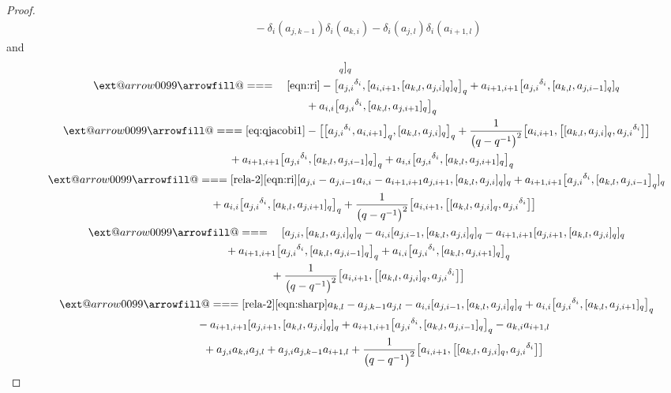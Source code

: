 \documentclass[10pt,a4paper]{amsart}
\makeatletter
\def\x@arrow{\DOTSB\Relbar}
\def\xlongequalsignfill@{\arrowfill@\x@arrow\Relbar\x@arrow}
\providecommand{\xlongequal}[2][]{%
	\ext@arrow 0099\xlongequalsignfill@{#1}{#2}}
\numberwithin{equation}{section}
\def\d{\delta}
\makeatother
\begin{document}
\begin{proof}
\begin{gather*}
\qquad\qquad {}-\d_i (a_{j,k-1} )\d_i (a_{k,i} ) -\d_i (a_{j, l} ) \d_i (a_{i+1, l} )
\end{gather*}
and
\begin{gather*}
 [\d_i(a_{j,i}), [\d_i (a_{k,l} ),\d_i(a_{j,i}) ]_q ]_q \\
 \qquad\xlongequal[\quad]{\eqref{eqn:ri}} - \bigl[{a_{j,i}}^{\d_i}, [a_{i,i+1}, [a_{k,l},a_{j,i} ]_q ]_q \bigr]_q + a_{i+1,i+1} \bigl[{a_{j,i}}^{\d_i}, [a_{k,l},a_{j,i-1} ]_q ]_q \\
\qquad\qquad\ \ {}+ a_{i,i} \bigl[{a_{j,i}}^{\d_i}, [a_{k,l},a_{j,i+1} ]_q \bigr]_q \\
 \qquad\xlongequal{\eqref{eq:qjacobi1}} - \bigl[ \bigl[{a_{j,i}}^{\d_i},a_{i,i+1} \bigr]_q, [a_{k,l},a_{j,i} ]_q \bigr]_q +\frac{1}{\bigl(q-q^{-1}\bigr)^2} \bigl[a_{i,i+1}, \bigl[ [a_{k,l},a_{j,i} ]_q, {a_{j,i}}^{\d_i} \bigr] \bigr]\\
\qquad\qquad \ \ {}+ a_{i+1,i+1} \bigl[{a_{j,i}}^{\d_i}, [a_{k,l},a_{j,i-1} ]_q \bigr]_q + a_{i,i} \bigl[{a_{j,i}}^{\d_i}, [a_{k,l},a_{j,i+1} ]_q \bigr]_q \\
\qquad \xlongequal[\eqref{rela-2}]{\eqref{eqn:ri}} [a_{j,i}-a_{j,i-1}a_{i,i}-a_{i+1,i+1}a_{j,i+1}, [a_{k,l},a_{j,i} ]_q ]_q + a_{i+1,i+1} \bigl[{a_{j,i}}^{\d_i}, [a_{k,l},a_{j,i-1} \bigr]_q ]_q \\
\qquad\qquad \quad {}+ a_{i,i} \bigl[{a_{j,i}}^{\d_i}, [a_{k,l},a_{j,i+1} ]_q \bigr]_q +\frac{1}{\bigl(q-q^{-1}\bigr)^2} \bigl[a_{i,i+1}, \bigl[ [a_{k,l},a_{j,i} ]_q, {a_{j,i}}^{\d_i} \bigr] \bigr]\\
\qquad \xlongequal{\quad} [a_{j,i}, [a_{k,l},a_{j,i} ]_q ]_q -a_{i,i} [a_{j,i-1}, [a_{k,l},a_{j,i} ]_q ]_q-a_{i+1,i+1} [a_{j,i+1}, [a_{k,l},a_{j,i} ]_q ]_q\\
 \qquad\qquad {}+ a_{i+1,i+1} \bigl[{a_{j,i}}^{\d_i}, [a_{k,l},a_{j,i-1} ]_q \bigr]_q + a_{i,i} \bigl[{a_{j,i}}^{\d_i}, [a_{k,l},a_{j,i+1} ]_q \bigr]_q\\
 \qquad\qquad {}+\frac{1}{\bigl(q-q^{-1}\bigr)^2} \bigl[a_{i,i+1}, \bigl[ [a_{k,l},a_{j,i} ]_q,{a_{j,i}}^{\d_i} \bigr] \bigr] \\
\qquad \xlongequal[\eqref{rela-2}]{\eqref{eqn:sharp}} a_{k,l}-a_{j,k-1}a_{j,l}-a_{i,i} [a_{j,i-1}, [a_{k,l},a_{j,i} ]_q ]_q+ a_{i,i} \bigl[{a_{j,i}}^{\d_i}, [a_{k,l},a_{j,i+1} ]_q \bigr]_q \\
 \qquad\qquad\quad {}-a_{i+1,i+1} [a_{j,i+1}, [a_{k,l},a_{j,i} ]_q ]_q+ a_{i+1,i+1} \bigl[{a_{j,i}}^{\d_i}, [a_{k,l},a_{j,i-1} ]_q \bigr]_q-a_{k,i}a_{i+1,l}\\
 \qquad\qquad\quad {}+a_{j,i}a_{k,i}a_{j,l}+a_{j,i}a_{j,k-1}a_{i+1,l} +\frac{1}{\bigl(q-q^{-1}\bigr)^2} \bigl[a_{i,i+1}, \bigl[ [a_{k,l},a_{j,i} ]_q, {a_{j,i}}^{\d_i} \bigr] \bigr]\\

\end{gather*}
\end{proof}
\end{document}
